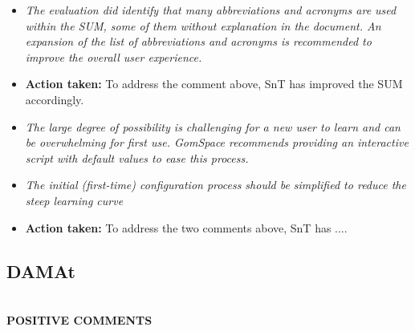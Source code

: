 \begin{itemize}

  \item \emph{The evaluation did identify that many abbreviations and acronyms are used within the SUM, some of them without explanation in the document. An expansion of the list of abbreviations and acronyms is recommended to improve the overall user experience.}

  \item \textbf{Action taken:} To address the comment above, SnT has improved the SUM accordingly.

  \item \emph{The large degree of possibility is challenging for a new user to learn and can be overwhelming for first use. GomSpace recommends providing an interactive script with default values to ease this process.}

  \item \emph{The initial (first-time) configuration process should be simplified to reduce the steep learning curve}

  \item \textbf{Action taken:} To address the two comments above, SnT has ....

\end{itemize}

\subsection{DAMAt} \ \\

\textbf{POSITIVE COMMENTS}

